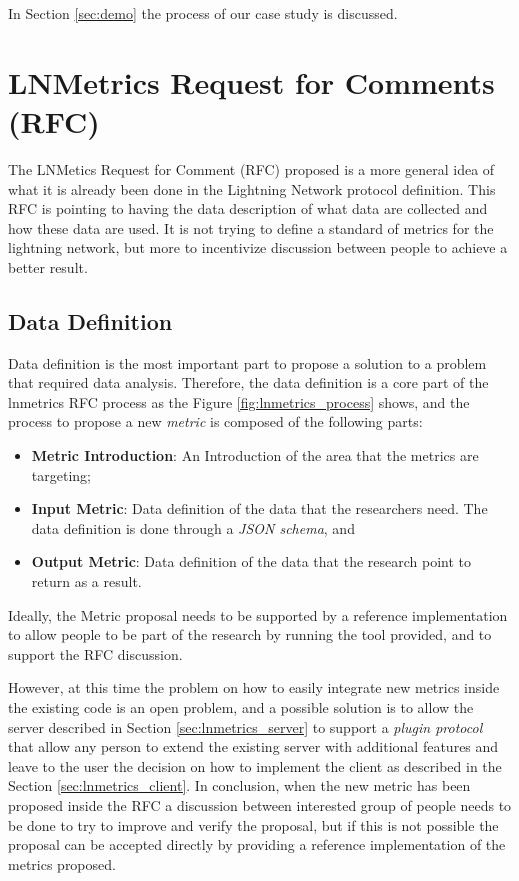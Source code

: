 In Section \ref{sec:demo} the process of our case study is discussed.

\section{LNMetrics Request for Comments (RFC)}

The LNMetics Request for Comment (RFC) proposed is a more general idea of what 
it is already been done in the Lightning Network protocol definition. 
This RFC is pointing to having the data description of what data are collected 
and how these data are used. It is not trying to define a 
standard of metrics for the lightning network, 
but more to incentivize discussion between people to achieve a better result.

\subsection{Data Definition}

Data definition is the most important part to propose a solution to a problem 
that required data analysis. Therefore, the data definition is a core 
part of the lnmetrics RFC process as the Figure \ref{fig:lnmetrics_process}
shows, and the process to propose a new \emph{metric} is composed of 
the following parts:

\begin{itemize}
    \item {\bf Metric Introduction}: An Introduction of the area that the metrics are targeting;
    \item {\bf Input Metric}: Data definition of the data that the researchers need. The data definition is done through a \emph{JSON schema}, and
    \item {\bf Output Metric}: Data definition of the data that the research point to return as a result. 
\end{itemize}

Ideally, the Metric proposal needs to be supported by a reference implementation to 
allow people to be part of the research by running the tool provided, and 
to support the RFC discussion.

However, at this time the problem on how to easily integrate new metrics inside the 
existing code is an open problem, and a possible solution is to allow the server 
described in Section \ref{sec:lnmetrics_server} to support a \emph{plugin protocol}
that allow any person to extend the existing server with additional features and leave to the user 
the decision on how to implement the client as described in the Section \ref{sec:lnmetrics_client}.
In conclusion, when the new metric has been proposed inside the RFC a discussion between interested 
group of people needs to be done to try to improve and verify the proposal, but if this is not possible
the proposal can be accepted directly by providing a reference implementation of the metrics proposed.

